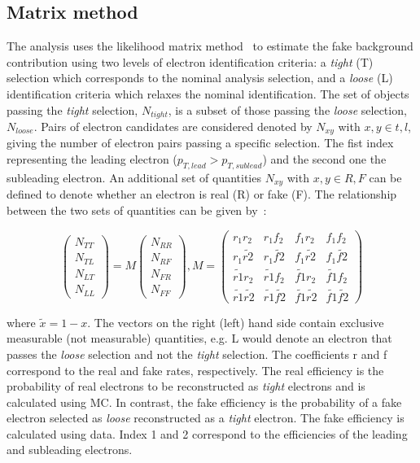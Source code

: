 \subsection{Matrix method}
The analysis uses the likelihood matrix method~\cite{Varnes:2016nrb} to estimate the fake background contribution using two levels of electron identification criteria: a \emph{tight} (T) selection which corresponds to the nominal analysis selection, and a \emph{loose} (L) identification criteria which relaxes the nominal identification. The set of objects passing the \emph{tight} selection, $N_{tight}$, is a subset of those passing the \emph{loose} selection, $N_{loose}$. Pairs of electron candidates are considered denoted by $N_{xy}$ with $x,y \in t,l$, giving the number of electron pairs passing a specific selection. The fist index representing the leading electron ($p_{T,lead} > p_{T,sublead}$) and the second one the subleading electron. An additional set of quantities $N_{xy}$ with $x,y \in R,F$ can be defined to denote whether an electron is real (R) or fake (F). The relationship between the two sets of quantities can be given by~\cite{EXOT-2016-05}:

\begin{equation}\label{eq:matrix_method_1}
\left(\begin{array}{c}N_{TT}\\ N_{TL}\\ N_{LT}\\ N_{LL}\end{array}\right) = M \left(\begin{array}{c}N_{RR}\\ N_{RF}\\ N_{FR}\\ N_{FF}\end{array}\right) , M =
    \begin{pmatrix}
    r_1r_2 & r_1f_2 &  f_1r_2 & f_1f_2\\
    r_1\tilde{r2} & r_1\tilde{f2} & f_1\tilde{r2} & f_1\tilde{f2}\\
    \tilde{r1}r_2 & \tilde{r1}f_2 & \tilde{f1}r_2 & \tilde{f1}f_2\\
    \tilde{r1}\tilde{r2} & \tilde{r1}\tilde{f2} & \tilde{f1}\tilde{r2} & \tilde{f1}\tilde{f2}  
    \end{pmatrix}
\end{equation}

where $\tilde{x} = 1 - x$. The vectors on the right (left) hand side contain exclusive measurable (not measurable) quantities, e.g. L would denote an electron that passes the \emph{loose} selection and not the \emph{tight} selection. The coefficients r and f correspond to the real and fake rates, respectively. The real efficiency is the probability of real electrons to be reconstructed as \emph{tight} electrons and is calculated using MC. In contrast, the fake efficiency is the probability of a fake electron selected as \emph{loose} reconstructed as a \emph{tight} electron. The fake efficiency is calculated using data. Index 1 and 2 correspond to the efficiencies of the leading and subleading electrons. 

